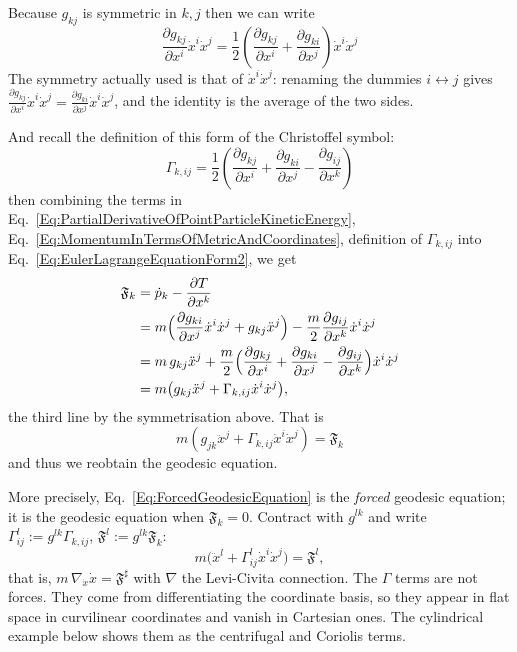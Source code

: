 Because $g_{kj}$ is symmetric in $k,j$ then we can write
\[
\frac{ \partial g_{kj}}{\partial x^i} \dot{x}^i \dot{x}^j
 = \frac{1}{2} \left( \frac{ \partial g_{kj}}{ \partial x^i}
   + \frac{ \partial g_{ki}}{\partial x^j} \right) \dot{x}^i \dot{x}^j
\]
The symmetry actually used is that of $\dot x^i\dot x^j$: renaming the
dummies $i\leftrightarrow j$ gives
$\frac{\partial g_{kj}}{\partial x^i}\dot x^i\dot x^j
=\frac{\partial g_{ki}}{\partial x^j}\dot x^i\dot x^j$, and the identity is the
average of the two sides.

\noindent And recall the definition of this form of the Christoffel symbol:
\[
	\Gamma_{k, ij} = \frac{1}{2} \left( \frac{ \partial g_{kj}}{ \partial x^i}
   + \frac{\partial g_{ki} }{ \partial x^j}
   - \frac{ \partial g_{ij} }{ \partial x^k} \right)
\]
then combining the terms in
Eq.~\ref{Eq:PartialDerivativeOfPointParticleKineticEnergy},
Eq.~\ref{Eq:MomentumInTermsOfMetricAndCoordinates}, definition of
$\Gamma_{k,ij}$ into Eq.~\ref{Eq:EulerLagrangeEquationForm2}, we get
\[
\begin{aligned}
 \mathfrak F_k
 &=\dot p_k-\frac{\partial T}{\partial x^k}\\
 &=m\Bigl(\frac{\partial g_{ki}}{\partial x^j}\dot x^i\dot x^j
   +g_{kj}\ddot x^j\Bigr)
   -\frac{m}{2}\frac{\partial g_{ij}}{\partial x^k}\dot x^i\dot x^j\\
 &=m\,g_{kj}\ddot x^j
   +\frac{m}{2}\Bigl(\frac{\partial g_{kj}}{\partial x^i}
     +\frac{\partial g_{ki}}{\partial x^j}
     -\frac{\partial g_{ij}}{\partial x^k}\Bigr)\dot x^i\dot x^j\\
 &=m\bigl(g_{kj}\ddot x^j+\Gamma_{k,ij}\dot x^i\dot x^j\bigr),
\end{aligned}
\]
the third line by the symmetrisation above. That is
\begin{equation}\label{Eq:ForcedGeodesicEquation}
m \left( g_{jk} \ddot{x}^j  + \Gamma_{k,ij} \dot{x}^i \dot{x}^j \right)
 = \mathfrak{F}_k
\end{equation}
and thus we reobtain the geodesic equation.

More precisely, Eq.~\ref{Eq:ForcedGeodesicEquation} is the \emph{forced}
geodesic equation; it is the geodesic equation when $\mathfrak F_k=0$.
Contract with $g^{lk}$ and write $\Gamma^l_{ij}:=g^{lk}\Gamma_{k,ij}$,
$\mathfrak F^l:=g^{lk}\mathfrak F_k$:
\[
 m\bigl(\ddot x^l+\Gamma^l_{ij}\dot x^i\dot x^j\bigr)=\mathfrak F^l ,
\]
that is, $m\,\nabla_{\dot x}\dot x=\mathfrak F^\sharp$ with $\nabla$ the
Levi-Civita connection. The $\Gamma$ terms are not forces. They come from
differentiating the coordinate basis, so they appear in flat space in
curvilinear coordinates and vanish in Cartesian ones. The cylindrical
example below shows them as the centrifugal and Coriolis terms.

